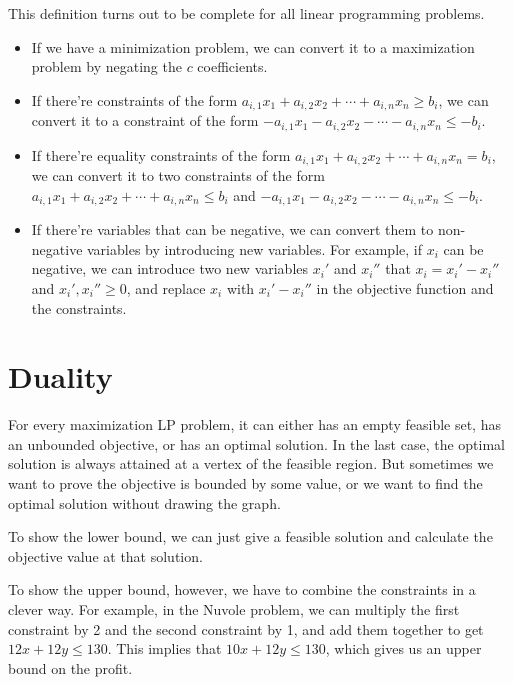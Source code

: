 \begin{remark}
	This definition turns out to be complete for all linear programming problems.
	\begin{itemize}
		\item If we have a minimization problem, we can convert it to a maximization problem by negating the $c$ coefficients.
		\item If there're constraints of the form $a_{i,1} x_1 + a_{i,2} x_2 + \cdots + a_{i,n} x_n \geq b_i$, we can convert it to a constraint of the form $-a_{i,1} x_1 - a_{i,2} x_2 - \cdots - a_{i,n} x_n \leq -b_i$.
		\item If there're equality constraints of the form $a_{i,1} x_1 + a_{i,2} x_2 + \cdots + a_{i,n} x_n = b_i$, we can convert it to two constraints of the form $a_{i,1} x_1 + a_{i,2} x_2 + \cdots + a_{i,n} x_n \leq b_i$ and $-a_{i,1} x_1 - a_{i,2} x_2 - \cdots - a_{i,n} x_n \leq -b_i$.
		\item If there're variables that can be negative, we can convert them to non-negative variables by introducing new variables. For example, if $x_i$ can be negative, we can introduce two new variables $x_i'$ and $x_i''$ that $x_i = x_i' - x_i''$ and $x_i', x_i'' \geq 0$, and replace $x_i$ with $x_i' - x_i''$ in the objective function and the constraints.
	\end{itemize}
\end{remark}

\section {Duality}

For every maximization LP problem, it can either has an empty feasible set, has an unbounded objective, or has an optimal solution. In the last case, the optimal solution is always attained at a vertex of the feasible region.
But sometimes we want to prove the objective is bounded by some value, or we want to find the optimal solution without drawing the graph.

To show the lower bound, we can just give a feasible solution and calculate the objective value at that solution.

To show the upper bound, however, we have to combine the constraints in a clever way. For example, in the Nuvole problem, we can multiply the first constraint by 2 and the second constraint by 1, and add them together to get $12x + 12y \leq 130$. This implies that $10x + 12y \leq 130$, which gives us an upper bound on the profit.

